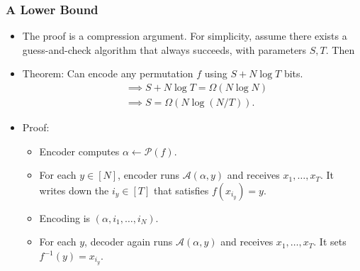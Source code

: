 \documentclass[usenames, dvipsnames, t, table]{beamer}
\newcommand{\A}{\mathcal{A}}
\renewcommand{\P}{\mathcal{P}}
\begin{document}

  \begin{frame}
    \frametitle{A Lower Bound}
    \begin{itemize}
    \item The proof is a compression argument. For simplicity, \newline
      assume there exists a guess-and-check algorithm \newline
      that always succeeds, with parameters $S, T$. Then
      \pause
    \item Theorem: Can encode any permutation $f$ using $S + N \log T$ bits.
      \pause
      \begin{align*}
        &\implies S + N \log T = \Omega(N \log N) \\
        &\implies S = \Omega(N \log (N/T)).
      \end{align*}
      \mypause
    \item Proof:
      \begin{itemize}
\item      Encoder computes $\alpha \gets \P(f)$.
      \pause
    \item For each $y \in [N]$, encoder runs $\A(\alpha, y)$ and receives $x_1, \dots, x_T$. It writes down the $i_y \in [T]$ that satisfies $f(x_{i_y}) = y$.
      \pause
    \item Encoding is $(\alpha, i_1, \dots, i_N)$.
      \pause
    \item For each $y$, decoder again runs $\A(\alpha, y)$ and receives $x_1, \dots, x_T$. It sets $f^{-1}(y) = x_{i_y}$.
    \end{itemize}
          \end{itemize}

      \end{frame}
\end{document}
